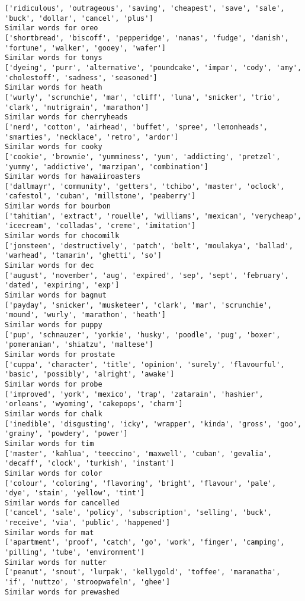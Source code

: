 \documentclass[11pt]{article}
\begin{document}
\begin{Verbatim}[commandchars=\\\{\}]
['ridiculous', 'outrageous', 'saving', 'cheapest', 'save', 'sale', 'buck', 'dollar', 'cancel', 'plus']
Similar words for oreo
['shortbread', 'biscoff', 'pepperidge', 'nanas', 'fudge', 'danish', 'fortune', 'walker', 'gooey', 'wafer']
Similar words for tonys
['dyeing', 'purr', 'alternative', 'poundcake', 'impar', 'cody', 'amy', 'cholestoff', 'sadness', 'seasoned']
Similar words for heath
['wurly', 'scrunchie', 'mar', 'cliff', 'luna', 'snicker', 'trio', 'clark', 'nutrigrain', 'marathon']
Similar words for cherryheads
['nerd', 'cotton', 'airhead', 'buffet', 'spree', 'lemonheads', 'smarties', 'necklace', 'retro', 'ardor']
Similar words for cooky
['cookie', 'brownie', 'yumminess', 'yum', 'addicting', 'pretzel', 'yummy', 'addictive', 'marzipan', 'combination']
Similar words for hawaiiroasters
['dallmayr', 'community', 'getters', 'tchibo', 'master', 'oclock', 'cafestol', 'cuban', 'millstone', 'peaberry']
Similar words for bourbon
['tahitian', 'extract', 'rouelle', 'williams', 'mexican', 'verycheap', 'icecream', 'colladas', 'creme', 'imitation']
Similar words for chocomilk
['jonsteen', 'destructively', 'patch', 'belt', 'moulakya', 'ballad', 'warhead', 'tamarin', 'ghetti', 'so']
Similar words for dec
['august', 'november', 'aug', 'expired', 'sep', 'sept', 'february', 'dated', 'expiring', 'exp']
Similar words for bagnut
['payday', 'snicker', 'musketeer', 'clark', 'mar', 'scrunchie', 'mound', 'wurly', 'marathon', 'heath']
Similar words for puppy
['pup', 'schnauzer', 'yorkie', 'husky', 'poodle', 'pug', 'boxer', 'pomeranian', 'shiatzu', 'maltese']
Similar words for prostate
['cuppa', 'character', 'title', 'opinion', 'surely', 'flavourful', 'basic', 'possibly', 'alright', 'awake']
Similar words for probe
['improved', 'york', 'mexico', 'trap', 'zatarain', 'hashier', 'orleans', 'wyoming', 'cakepops', 'charm']
Similar words for chalk
['inedible', 'disgusting', 'icky', 'wrapper', 'kinda', 'gross', 'goo', 'grainy', 'powdery', 'power']
Similar words for tim
['master', 'kahlua', 'teeccino', 'maxwell', 'cuban', 'gevalia', 'decaff', 'clock', 'turkish', 'instant']
Similar words for color
['colour', 'coloring', 'flavoring', 'bright', 'flavour', 'pale', 'dye', 'stain', 'yellow', 'tint']
Similar words for cancelled
['cancel', 'sale', 'policy', 'subscription', 'selling', 'buck', 'receive', 'via', 'public', 'happened']
Similar words for mat
['apartment', 'proof', 'catch', 'go', 'work', 'finger', 'camping', 'pilling', 'tube', 'environment']
Similar words for nutter
['peanut', 'snout', 'lurpak', 'kellygold', 'toffee', 'maranatha', 'if', 'nuttzo', 'stroopwafeln', 'ghee']
Similar words for prewashed

\end{Verbatim}
\end{document}
